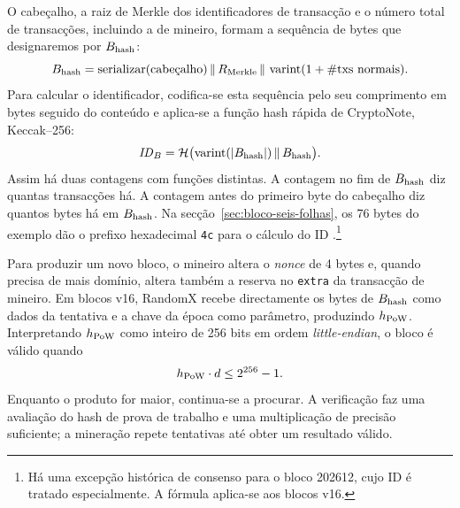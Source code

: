 
%
O cabeçalho, a raiz de Merkle dos identificadores de transacção e o
número total de transacções, incluindo a de mineiro, formam a sequência
de bytes que designaremos por \(B_{\rm hash}\):
\[
 B_{\rm hash}=\operatorname{serializar}(\text{cabeçalho})
            \,\|\,R_{\rm Merkle}
            \,\|\,\operatorname{varint}(1+\#\text{txs normais}).
\]
Para calcular o identificador, codifica-se esta sequência pelo seu
comprimento em bytes seguido do conteúdo e aplica-se a função hash
rápida de CryptoNote, Keccak--256:
\[
  \mathit{ID}_B=\mathcal H\bigl(
     \operatorname{varint}(|B_{\rm hash}|)\,\|\,B_{\rm hash}\bigr).
\]
Assim há duas contagens com funções distintas. A contagem no fim de
\(B_{\rm hash}\) diz quantas transacções há. A contagem antes do primeiro
byte do cabeçalho diz quantos bytes há em \(B_{\rm hash}\). Na
secção~\ref{sec:bloco-seis-folhas}, os 76 bytes do exemplo dão o prefixo
hexadecimal \texttt{4c} para o cálculo do ID
\cite{monero-source-v16}.\footnote{Há uma excepção histórica de consenso
para o bloco 202612, cujo ID é tratado especialmente. A fórmula aplica-se
aos blocos v16.}

Para produzir um novo bloco, o mineiro altera o \emph{nonce} de 4 bytes e,
quando precisa de mais domínio, altera também a reserva no \texttt{extra} da
transacção de mineiro. Em blocos v16, RandomX recebe directamente os bytes
de \(B_{\rm hash}\) como dados da tentativa e a chave da época como parâmetro,
produzindo \(h_{\rm PoW}\).
Interpretando $h_{\rm PoW}$ como inteiro de 256 bits em ordem
\emph{little-endian}, o bloco é válido quando
\begin{align*}
h_{\rm PoW}\cdot d\leq2^{256}-1.
\end{align*}
Enquanto o produto for maior, continua-se a procurar. A verificação faz uma
avaliação do hash de prova de trabalho e uma multiplicação de precisão
suficiente; a mineração repete tentativas até obter um resultado válido.

